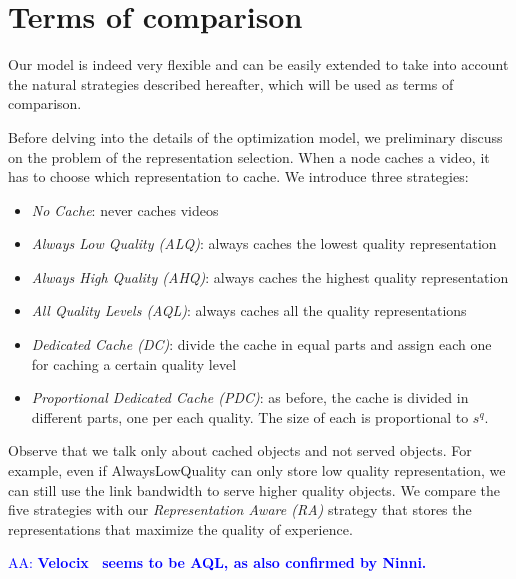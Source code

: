 \documentclass[10pt, journal,letterpaper]{IEEEtran}
\newcommand{\AAra}[1]{\textcolor{blue}{AA: \bf #1}}
\begin{document}

\section{Terms of comparison}
Our model is indeed very flexible and can be easily extended to take into account the natural strategies described hereafter, which will be used as terms of comparison.

Before delving into the details of the optimization model, we preliminary discuss on the problem of the representation selection. When a node caches a video, it has to choose which representation to cache. We introduce three strategies:
	\begin{itemize}
		\item \emph{No Cache}: never caches videos
		\item \emph{Always Low Quality (ALQ)}: always caches the lowest quality representation
		\item \emph{Always High Quality (AHQ)}: always caches the highest quality representation
		\item \emph{All Quality Levels (AQL)}: always caches all the quality representations
		\item \emph{Dedicated Cache (DC)}: divide the cache in equal parts and assign each one for caching a certain quality level
		\item \emph{Proportional Dedicated Cache (PDC)}: as before, the cache is divided in different parts, one per each quality. The size of each is proportional to $s^q$.
	\end{itemize}

Observe that we talk only about cached objects and not served objects. For example, even if AlwaysLowQuality can only store low quality representation, we can still use the link bandwidth to serve higher quality objects.
We compare the five strategies with our \emph{Representation Aware (RA)} strategy that stores the representations that maximize the quality of experience. 

\AAra{Velocix~\cite{Velocix} seems to be AQL, as also confirmed by Ninni.}
\end{document}
